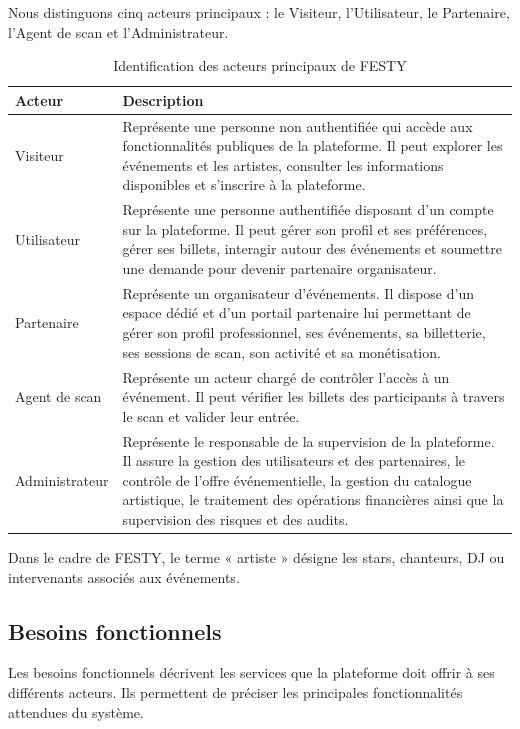 Nous distinguons cinq acteurs principaux : le Visiteur, l’Utilisateur, le Partenaire, l’Agent de scan et l’Administrateur.


\begin{table}[H]
\centering
\caption{Identification des acteurs principaux de FESTY}
\label{tableau:2-1}
\renewcommand{\arraystretch}{1.2}
\begin{tabularx}{\textwidth}{|>{\raggedright\arraybackslash}X|>{\raggedright\arraybackslash}X|}
\hline
\rowcolor[HTML]{ECF4FF}
\textbf{Acteur} & \textbf{Description} \\
\hline
Visiteur & Représente une personne non authentifiée qui accède aux fonctionnalités publiques de la plateforme. Il peut explorer les événements et les artistes, consulter les informations disponibles et s’inscrire à la plateforme. \\
\hline
Utilisateur & Représente une personne authentifiée disposant d’un compte sur la plateforme. Il peut gérer son profil et ses préférences, gérer ses billets, interagir autour des événements et soumettre une demande pour devenir partenaire organisateur. \\
\hline
Partenaire & Représente un organisateur d’événements. Il dispose d’un espace dédié et d’un portail partenaire lui permettant de gérer son profil professionnel, ses événements, sa billetterie, ses sessions de scan, son activité et sa monétisation. \\
\hline
Agent de scan & Représente un acteur chargé de contrôler l’accès à un événement. Il peut vérifier les billets des participants à travers le scan et valider leur entrée. \\
\hline
Administrateur & Représente le responsable de la supervision de la plateforme. Il assure la gestion des utilisateurs et des partenaires, le contrôle de l’offre événementielle, la gestion du catalogue artistique, le traitement des opérations financières ainsi que la supervision des risques et des audits. \\
\hline
\end{tabularx}
\end{table}


Dans le cadre de FESTY, le terme « artiste » désigne les stars, chanteurs, DJ ou intervenants associés aux événements.


\subsection{Besoins fonctionnels}


Les besoins fonctionnels décrivent les services que la plateforme doit offrir à ses différents acteurs. Ils permettent de préciser les principales fonctionnalités attendues du système.


